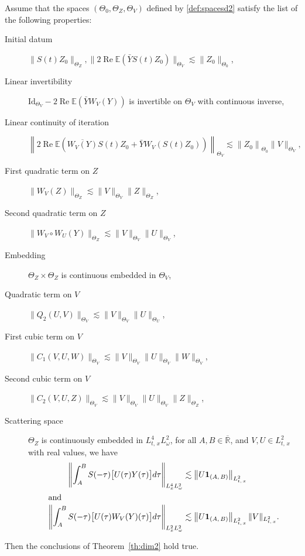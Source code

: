 \documentclass[AHL, Unicode, longabstracts,published]{cedram}
\newcommand{\R}{\mathbb{R}}
\newcommand{\E}{\mathbb{E}}
\DeclareMathOperator{\re}{Re}
\newcommand{\bfun}{\mathbf{1}}
\newcommand{\barR}{\overline{\R}}
\begin{document}
\begin{prop}\label{prop:principedim2}
Assume that the spaces $(\Theta_0,\Theta_Z,\Theta_V)$ defined by \eqref{def:spacesd2} satisfy the list of the following properties:
\begin{description}
\item[Initial datum] $\|S(t)Z_0\|_{\Theta_Z}, \|2\re \E(\bar Y S(t) Z_0)\|_{\Theta_V}\lesssim \|Z_0\|_{\Theta_0}$,
\item[Linear invertibility] $\textrm{Id}_{\Theta_V} - 2\re\E (\bar Y W_V(Y))$ is invertible on $\Theta_V$ with continuous inverse,
\item[Linear continuity of iteration]
\[
\left\|2\re \E \left(\overline{W_V(Y)} S(t) Z_0 + \bar Y W_V\left(S(t) Z_0\right)\right)\right\|_{\Theta_V} \lesssim \left\|Z_0\right\|_{\Theta_0} \|V\|_{\Theta_V},
\]
\item[First quadratic term on $Z$] $\|W_V(Z)\|_{\Theta_Z} \lesssim \|V\|_{\Theta_V}\|Z\|_{\Theta_Z}$,
\item[Second quadratic term on $Z$] $\|W_V\circ W_U (Y)\|_{\Theta_Z} \lesssim \|V\|_{\Theta_V}\|U\|_{\Theta_V}$,
\item[Embedding] $\Theta_Z \times \Theta_Z$ is continuous embedded in $\Theta_V$,
\item[Quadratic term on $V$] $\|Q_2(U,V)\|_{\Theta_V} \lesssim \|V\|_{\Theta_V}\|U\|_{\Theta_U}$,
\item[First cubic term on $V$] $\|C_1(V,U,W)\|_{\Theta_V} \lesssim \|V\|_{\Theta_V}\|U\|_{\Theta_V}\|W\|_{\Theta_V}$,
\item[Second cubic term on $V$] $\|C_2(V,U,Z)\|_{\Theta_V} \lesssim \|V\|_{\Theta_V}\|U\|_{\Theta_V}\|Z\|_{\Theta_Z}$,
\item[Scattering space] $\Theta_Z$ is continuously embedded in $L^4_{t,\,x} L^2_\omega$, for all $A,B \in \barR$, and $V,U \in L^2_{t,\,x}$ with real values, we have
\begin{align*}
\left\| \int_A^B S(-\tau) \big[U(\tau) Y(\tau) \big] d\tau \right\|_{L^4_x L^2_\omega} &\lesssim \left\|U\bfun_{(A,\,B)}\right\|_{L^2_{t,\,x}}
\\
\intertext{and}
\left\| \int_A^B S(-\tau) \big[U(\tau) W_V(Y)(\tau) \big] d\tau \right\|_{L^2_x L^2_\omega} &\lesssim \left\|U\bfun_{(A,\,B)}\right\|_{L^2_{t,\,x}}\|V\|_{L^2_{t,\,x}}.
\end{align*}
\end{description}
Then the conclusions of Theorem~\ref{th:dim2} hold true.
\end{prop}
\end{document}
